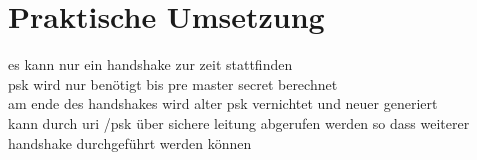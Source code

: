 \chapter{Praktische Umsetzung}

es kann nur ein handshake zur zeit stattfinden\\
psk wird nur benötigt bis pre master secret berechnet\\
am ende des handshakes wird alter psk vernichtet und neuer generiert\\
kann durch uri /psk über sichere leitung abgerufen werden so dass weiterer handshake durchgeführt werden können



